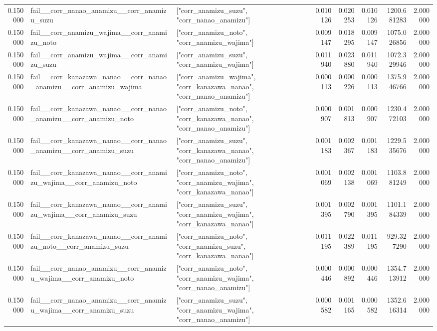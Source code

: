 \begin{tabular}{rllrrrrr}
0.150000 & fail\_\_corr\_nanao\_anamizu\_\_corr\_anamizu\_suzu & ["corr\_anamizu\_suzu", "corr\_nanao\_anamizu"] & 0.010126 & 0.020253 & 0.010126 & 1200.681283 & 2.000000 \\
0.150000 & fail\_\_corr\_anamizu\_wajima\_\_corr\_anamizu\_noto & ["corr\_anamizu\_noto", "corr\_anamizu\_wajima"] & 0.009147 & 0.018295 & 0.009147 & 1075.026856 & 2.000000 \\
0.150000 & fail\_\_corr\_anamizu\_wajima\_\_corr\_anamizu\_suzu & ["corr\_anamizu\_suzu", "corr\_anamizu\_wajima"] & 0.011940 & 0.023880 & 0.011940 & 1072.329946 & 2.000000 \\
0.150000 & fail\_\_corr\_kanazawa\_nanao\_\_corr\_nanao\_anamizu\_\_corr\_anamizu\_wajima & ["corr\_anamizu\_wajima", "corr\_kanazawa\_nanao", "corr\_nanao\_anamizu"] & 0.000113 & 0.000226 & 0.000113 & 1375.946766 & 2.000000 \\
0.150000 & fail\_\_corr\_kanazawa\_nanao\_\_corr\_nanao\_anamizu\_\_corr\_anamizu\_noto & ["corr\_anamizu\_noto", "corr\_kanazawa\_nanao", "corr\_nanao\_anamizu"] & 0.000907 & 0.001813 & 0.000907 & 1230.472103 & 2.000000 \\
0.150000 & fail\_\_corr\_kanazawa\_nanao\_\_corr\_nanao\_anamizu\_\_corr\_anamizu\_suzu & ["corr\_anamizu\_suzu", "corr\_kanazawa\_nanao", "corr\_nanao\_anamizu"] & 0.001183 & 0.002367 & 0.001183 & 1229.535676 & 2.000000 \\
0.150000 & fail\_\_corr\_kanazawa\_nanao\_\_corr\_anamizu\_wajima\_\_corr\_anamizu\_noto & ["corr\_anamizu\_noto", "corr\_anamizu\_wajima", "corr\_kanazawa\_nanao"] & 0.001069 & 0.002138 & 0.001069 & 1103.881249 & 2.000000 \\
0.150000 & fail\_\_corr\_kanazawa\_nanao\_\_corr\_anamizu\_wajima\_\_corr\_anamizu\_suzu & ["corr\_anamizu\_suzu", "corr\_anamizu\_wajima", "corr\_kanazawa\_nanao"] & 0.001395 & 0.002790 & 0.001395 & 1101.184339 & 2.000000 \\
0.150000 & fail\_\_corr\_kanazawa\_nanao\_\_corr\_anamizu\_noto\_\_corr\_anamizu\_suzu & ["corr\_anamizu\_noto", "corr\_anamizu\_suzu", "corr\_kanazawa\_nanao"] & 0.011195 & 0.022389 & 0.011195 & 929.327290 & 2.000000 \\
0.150000 & fail\_\_corr\_nanao\_anamizu\_\_corr\_anamizu\_wajima\_\_corr\_anamizu\_noto & ["corr\_anamizu\_noto", "corr\_anamizu\_wajima", "corr\_nanao\_anamizu"] & 0.000446 & 0.000892 & 0.000446 & 1354.713912 & 2.000000 \\
0.150000 & fail\_\_corr\_nanao\_anamizu\_\_corr\_anamizu\_wajima\_\_corr\_anamizu\_suzu & ["corr\_anamizu\_suzu", "corr\_anamizu\_wajima", "corr\_nanao\_anamizu"] & 0.000582 & 0.001165 & 0.000582 & 1352.616314 & 2.000000 \\

\end{tabular}
